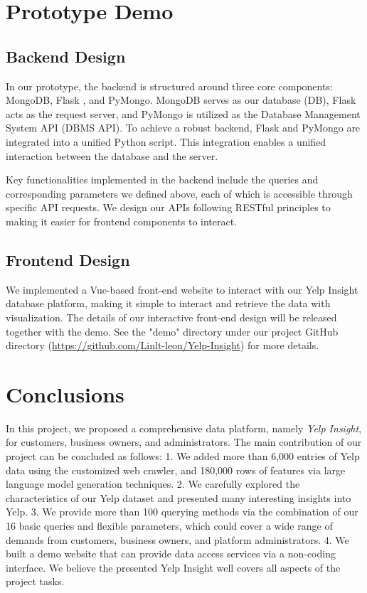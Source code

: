 \documentclass[runningheads]{llncs}
\begin{document}
\section{Prototype Demo}

\subsection{Backend Design}

In our prototype, the backend is structured around three core components: MongoDB, Flask \cite{grinberg2018flask}, and PyMongo. MongoDB serves as our database (DB), Flask acts as the request server, and PyMongo is utilized as the Database Management System API (DBMS API). To achieve a robust backend, Flask and PyMongo are integrated into a unified Python script. This integration enables a unified interaction between the database and the server.

Key functionalities implemented in the backend include the queries and corresponding parameters we defined above, each of which is accessible through specific API requests. We design our APIs following RESTful principles \cite{RichardsonRuby07} to making it easier for frontend components to interact.

\subsection{Frontend Design}

We implemented a Vue-based front-end website to interact with our Yelp Insight database platform, making it simple to interact and retrieve the data with visualization. The details of our interactive front-end design will be released together with the demo. See the "demo" directory under our project GitHub directory (\url{https://github.com/Linlt-leon/Yelp-Insight}) for more details.


\section{Conclusions}

In this project, we proposed a comprehensive data platform, namely \textit{Yelp Insight}, for customers, business owners, and administrators. The main contribution of our project can be concluded as follows: 1. We added more than 6,000 entries of Yelp data using the customized web crawler, and 180,000 rows of features via large language model generation techniques. 2. We carefully explored the characteristics of our Yelp dataset and presented many interesting insights into Yelp. 3. We provide more than 100 querying methods via the combination of our 16 basic queries and flexible parameters, which could cover a wide range of demands from customers, business owners, and platform administrators. 4. We built a demo website that can provide data access services via a non-coding interface. We believe the presented Yelp Insight well covers all aspects of the project tasks.
\end{document}
